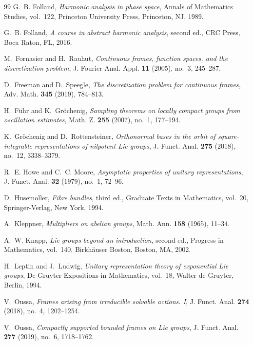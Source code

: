 \documentclass[reqno]{amsart}
\numberwithin{equation}{section}
\theoremstyle{definition}
\theoremstyle{remark}
\begin{document}
\begin{thebibliography}{99}
G.~B. Folland,
\emph{Harmonic analysis in phase space},
Annals of Mathematics Studies, vol.~122, Princeton University Press,
Princeton, NJ, 1989.

G.~B. Folland,
\emph{A course in abstract harmonic analysis}, second ed.,
CRC Press, Boca Raton, FL, 2016.

M.~Fornasier and H.~Rauhut,
\emph{Continuous frames, function spaces, and the discretization problem},
J. Fourier Anal. Appl. \textbf{11} (2005), no.~3, 245--287.

D.~Freeman and D.~Speegle,
\emph{The discretization problem for continuous frames},
Adv. Math. \textbf{345} (2019), 784--813.

H.~F\"uhr and K.~Gr\"ochenig,
\emph{Sampling theorems on locally compact groups from oscillation estimates},
Math. Z. \textbf{255} (2007), no.~1, 177--194.

K.~Gr\"ochenig and D.~Rottensteiner,
\emph{Orthonormal bases in the orbit of square-integrable representations of
nilpotent Lie groups},
J. Funct. Anal. \textbf{275} (2018), no.~12, 3338--3379.

R.~E. Howe and C.~C. Moore,
\emph{Asymptotic properties of unitary representations},
J. Funct. Anal. \textbf{32} (1979), no.~1, 72--96.

D.~Husemoller,
\emph{Fibre bundles}, third ed.,
Graduate Texts in Mathematics, vol.~20, Springer-Verlag, New York, 1994.

A.~Kleppner,
\emph{Multipliers on abelian groups},
Math. Ann. \textbf{158} (1965), 11--34.

A.~W. Knapp,
\emph{Lie groups beyond an introduction}, second ed.,
Progress in Mathematics, vol.~140, Birkh\"auser Boston, Boston, MA, 2002.

H.~Leptin and J.~Ludwig,
\emph{Unitary representation theory of exponential Lie groups},
De Gruyter Expositions in Mathematics, vol.~18, Walter de Gruyter, Berlin,
1994.

V.~Oussa,
\emph{Frames arising from irreducible solvable actions. I},
J. Funct. Anal. \textbf{274} (2018), no.~4, 1202--1254.

V.~Oussa,
\emph{Compactly supported bounded frames on Lie groups},
J. Funct. Anal. \textbf{277} (2019), no.~6, 1718--1762.


\end{thebibliography}
\end{document}

